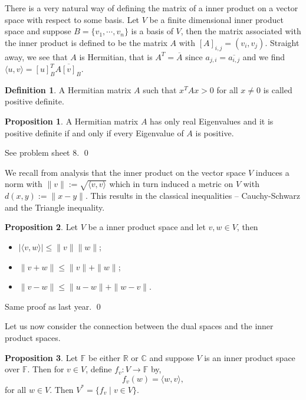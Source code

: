 \documentclass[
]{article}
\theoremstyle{definition}
\newtheorem{prop}{Proposition}[section]
\theoremstyle{definition}
\newtheorem{definition}{Definition}[section]
\begin{document}
There is a very natural way of defining the matrix of a inner product on
a vector space with respect to some basis. Let \(V\) be a finite
dimensional inner product space and suppose \(B = \{v_1, \cdots, v_n\}\)
is a basis of \(V\), then the matrix associated with the inner product
is defined to be the matrix \(A\) with \([A]_{i, j} = (v_i, v_j)\).
Straight away, we see that \(A\) is Hermitian, that is
\(A^T = \overline{A}\) since \(a_{j, i} = \overline{a_{i, j}}\) and we
find \(\langle u, v \rangle = [u]_B^T A \overline{[v]}_B\).

\begin{definition}
  A Hermitian matrix \(A\) such that \(x^T A x > 0\) for all \(x \neq 0\) is called 
  positive definite. 
\end{definition}

\begin{prop}
  A Hermitian matrix \(A\) has only real Eigenvalues and it is positive definite 
  if and only if every Eigenvalue of \(A\) is positive.
\end{prop}
\proof

See problem sheet 8. \qed

We recall from analysis that the inner product on the vector space \(V\)
induces a norm with \(\| v \| := \sqrt{\langle v, v \rangle}\) which in
turn induced a metric on \(V\) with \(d(x, y) := \| x - y\|\). This
results in the classical inequalities -- Cauchy-Schwarz and the Triangle
inequality.

\begin{prop}
  Let \(V\) be a inner product space and let \(v, w \in V\), then 
  \begin{itemize}
    \item \(\left| \langle v, w \rangle\right| \le \|v\| \|w\|\);
    \item \(\|v + w\| \le \|v\| + \|w\|\);
    \item \(\|v - w\| \le \|u - w\| + \|w - v\|\).
  \end{itemize}
\end{prop}
\proof

Same proof as last year. \qed

Let us now consider the connection between the dual spaces and the inner
product spaces.

\begin{prop}\label{dual}
  Let \(\mathbb{F}\) be either \(\mathbb{R}\) or \(\mathbb{C}\) and 
  suppose \(V\) is an inner product space over \(\mathbb{F}\). Then for \(v \in V\),
  define \(f_v : V \to \mathbb{F}\) by,
  \[f_v(w) = \langle w, v \rangle,\]
  for all \(w \in V\). Then \(V^* = \{f_v \mid v \in V\}\).
\end{prop}
\end{document}
